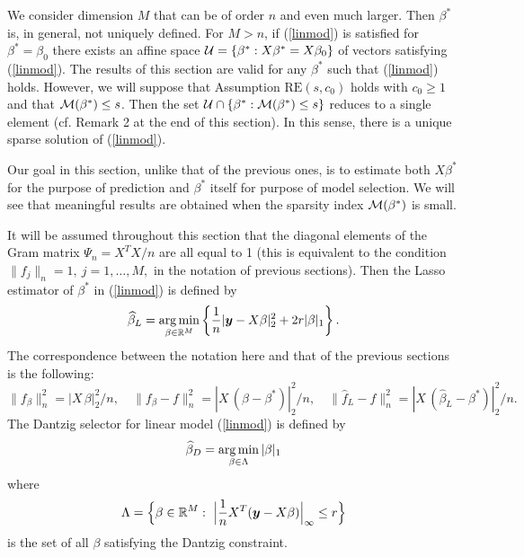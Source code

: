 \documentclass[dvips,aos]{imsart}
\numberwithin{equation}{section}
\theoremstyle{plain}
\def\argmin{\mathop{\mathrm{arg\,min}}}
\def\sf{}
\def\wideth{\widehat}
\def\scm{{\cal M}}
\def\wh{\widehat}
\def\RR{\mathbb R}
\def\RE#1#2{$\text{RE}(#1,#2)$}
\newcommand{\bb}{\mbox{\boldmath$\beta$}}
\def\bb{\beta}
\newcommand{\bmy}{\mbox{\boldmath$y$}}
\def\argmin{\mathop{\rm arg\, min}}
\begin{document}
We consider dimension $M$ that can be of order $n$ and even much
larger. Then $\bb^*$ is, in general, not uniquely defined. For
$M>n$, if (\ref{linmod}) is satisfied for $\bb^*=\bb_0$ there exists
an affine space ${\cal U}=\{\bb^*:X\bb^* = X\bb_0\}$ of vectors
satisfying (\ref{linmod}). The results of this section are valid for
any $\bb^*$ such that (\ref{linmod}) holds. However, we will suppose
that Assumption \RE s{c_0} holds with $c_0\ge1$ and that
$\scm(\beta^*)\le s$. Then the set ${\cal U}\cap \{\bb^*:
\scm(\beta^*)\le s\}$ reduces to a single element (cf. Remark 2 at
the end of this section). In this sense, there is a unique sparse
solution of (\ref{linmod}).


Our goal in this section, unlike that of the previous ones, is to
estimate both $X\bb^*$ for the purpose of prediction and $\bb^*$
itself for purpose of model selection. We will see that meaningful
results are obtained when the sparsity index $\scm(\bb^*)$ is small.

It will be assumed throughout this section that the diagonal
elements of the Gram matrix $\Psi_n = X^TX/n$ are all equal to 1
(this is equivalent to the condition $\|f_j\|_n=1,\ j=1,\ldots,M,$
in the notation of previous sections). Then the Lasso estimator of
$\bb^*$ in (\ref{linmod}) is defined by
\begin{equation}\begin{split}\label{Lasso}
\wh{\bb}_L = \argmin_{\bb\in\RR^M} \left\{ \frac{1}{n}|\bmy-X\bb|_2^2 +
2r|\bb|_1 \right\}.
\end{split}\end{equation}
The correspondence between the notation here and that of the previous sections is the following:
$$
\| {\sf f}_{\beta}\|_n^2 = |X\,\bb|_2^2/n, \quad \| {\sf
f}_{\beta} - f\|_n^2 = |X\,(\bb-\bb^*)|_2^2/n, \quad \| \wideth f_L - f\|_n^2=|X\,(\widehat\bb_L-\bb^*)|_2^2/n.
$$
The Dantzig selector for linear model (\ref{linmod}) is defined by
\begin{equation}\begin{split}\label{dl4}
\widehat \bb_D = \argmin_{\bb\in\Lambda}|\bb|_1
\end{split}\end{equation}
where
$$
\Lambda= \Big\{\bb\in\RR^M:\ \Big|\frac{1}{n}X^T(\bmy-X\bb)\Big|_\infty
\le r \Big\}
$$
is the set of all $\bb$ satisfying the Dantzig constraint.
\end{document}
